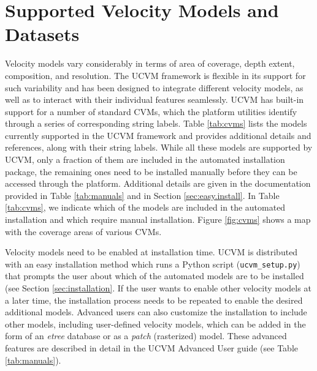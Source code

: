 




\section{Supported Velocity Models and Datasets}
\label{sec:cvms}

Velocity models vary considerably in terms of area of coverage, depth extent, composition, and resolution. The UCVM framework is flexible in its support for such variability and has been designed to integrate different velocity models, as well as to interact with their individual features seamlessly. UCVM has built-in support for a number of standard CVMs, which the platform utilities identify through a series of corresponding string labels. Table \ref{tab:cvms} lists the models currently supported in the UCVM framework and provides additional details and references, along with their string labels. While all these models are supported by UCVM, only a fraction of them are included in the automated installation package, the remaining ones need to be installed manually before they can be accessed through the platform. Additional details are given in the documentation provided in Table \ref{tab:manuals} and in Section \ref{sec:easy.install}. In Table \ref{tab:cvms}, we indicate which of the models are included in the automated installation and which require manual installation. Figure \ref{fig:cvms} shows a map with the coverage areas of various CVMs.

Velocity models need to be enabled at installation time. UCVM is distributed with an easy installation method which runs a Python script (\texttt{ucvm\_setup.py}) that prompts the user about which of the automated models are to be installed (see Section \ref{sec:installation}. If the user wants to enable other velocity models at a later time, the installation process needs to be repeated to enable the desired additional models. Advanced users can also customize the installation to include other models, including user-defined velocity models, which can be added in the form of an \textit{etree} \citep{Tu_2003_Tech} database or as a \textit{patch} (rasterized) model. These advanced features are described in detail in the UCVM Advanced User guide (see Table \ref{tab:manuals}).

